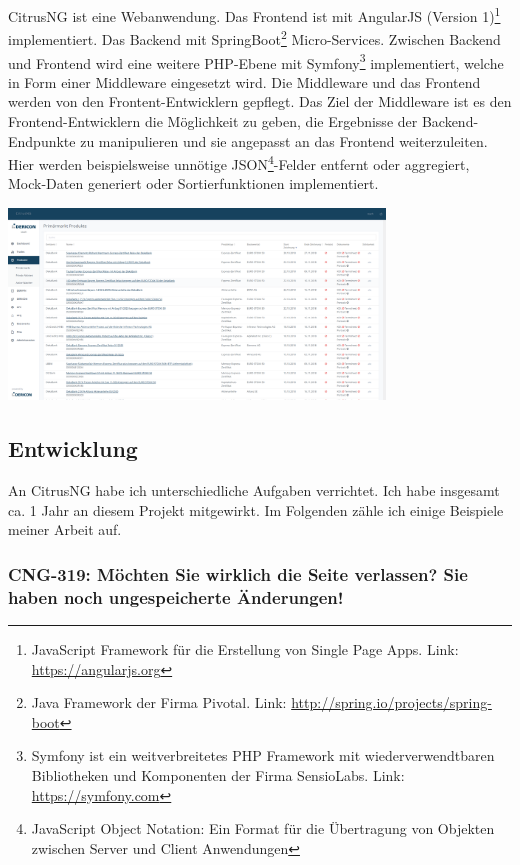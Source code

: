 \documentclass[chapterprefix=false, 12pt, a4paper, oneside, parskip=half, listof=totoc, bibliography=totoc, numbers=noendperiod]{scrbook}
\begin{document}
    CitrusNG ist eine Webanwendung. Das Frontend ist mit AngularJS (Version 1)\footnote{JavaScript Framework für die Erstellung von
    Single Page Apps. Link: \url{https://angularjs.org}} implementiert.
    Das Backend mit SpringBoot\footnote{Java Framework der Firma Pivotal. Link: \url{http://spring.io/projects/spring-boot}} Micro-Services.
    Zwischen Backend und Frontend wird eine weitere PHP-Ebene mit Symfony\footnote{Symfony ist ein weitverbreitetes
    PHP Framework mit wiederverwendtbaren Bibliotheken und Komponenten der Firma SensioLabs. Link: \url{https://symfony.com}}
    implementiert, welche in Form einer Middleware eingesetzt wird. Die Middleware und das Frontend werden von den Frontent-Entwicklern gepflegt.
    Das Ziel der Middleware ist es den Frontend-Entwicklern die Möglichkeit zu geben, die Ergebnisse der
    Backend-Endpunkte zu manipulieren und sie angepasst an das Frontend weiterzuleiten. 
    Hier werden beispielsweise unnötige JSON\footnote{JavaScript Object Notation: Ein Format für die Übertragung von
    Objekten zwischen Server und Client Anwendungen}-Felder entfernt oder
    aggregiert, Mock-Daten generiert oder Sortierfunktionen implementiert.

    \begin{center}
        \includegraphics[width=0.75\textwidth]{img/citrusng.png}
    \end{center}

    \subsection{Entwicklung}

    An CitrusNG habe ich unterschiedliche Aufgaben verrichtet. Ich habe insgesamt ca. 1 Jahr an diesem Projekt mitgewirkt.
    Im Folgenden zähle ich einige Beispiele meiner Arbeit auf.

    \subsubsection{CNG-319: Möchten Sie wirklich die Seite verlassen? Sie haben noch ungespeicherte Änderungen!}
\end{document}
